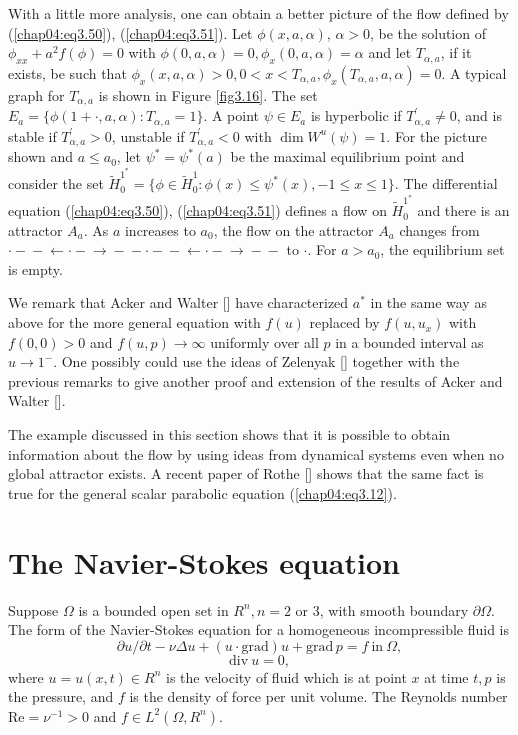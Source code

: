 \documentclass{surv-l}
\theoremstyle{plain}
\theoremstyle{definition}
\numberwithin{equation}{section}
\numberwithin{figure}{chapter}
\begin{document}
With a little more analysis, one can obtain a better picture of the flow defined by (\ref{chap04:eq3.50}), (\ref{chap04:eq3.51}). Let $\phi(x, a, \alpha)$, $\alpha>0$, be the solution of $\phi_{xx}+a^{2}f(\phi)=0$ with $\phi(0,a,\alpha)=0,\phi_{x}(0, a,\alpha)=\alpha$ and let $T_{\alpha,a}$, if it exists, be such that $\phi_{x}(x,a,\alpha)> 0,0<x<T_{\alpha,a},\phi_{x}(T_{\alpha,a},a,\alpha)=0$. A typical graph for $T_{\alpha,a}$ is shown in Figure \ref{fig3.16}. The set $E_{a}=\{\phi(1+\cdot,a,\alpha):T_{\alpha,a}=1\}$. A point $\psi\in E_{a}$ is hyperbolic if $T_{\alpha,a}^{\prime}\neq 0$, and is stable if $T_{\alpha,a}^{\prime}>0$, unstable if $T_{\alpha,a}^{\prime}<0$ with $\dim W^{u}(\psi)=1$. For the picture shown and $a\leq a_{0}$, let $\psi^{\ast}=\psi^{\ast}(a)$ be the maximal equilibrium point and consider the set $\tilde{H}_{0}^{1^{\ast}} =\{\phi\in\tilde{H}_{0}^{1}\!:\phi(x)\leq\psi^{\ast}(x), -1\leq x\leq 1\}$. The differential equation (\ref{chap04:eq3.50}), (\ref{chap04:eq3.51}) defines a flow on $\tilde{H}_{0}^{1^{\ast}}$ and there is an attractor $A_{a}$. As $a$ increases to $a_{0}$, the flow on the attractor $A_{a}$ changes from $\cdot-\!\!\!-\!\!\!\leftarrow\cdot-\!\!\!\rightarrow\!\!\!-\!\!\!-\cdot-\!\!\!-\!\!\!\leftarrow\cdot-\!\!\!\rightarrow\!\!\!-\!\!\!-$ to $\cdot$. For $a>a_{0}$, the equilibrium set is empty.

We remark that Acker and Walter [\citeyear{1978aw}] have characterized $a^{\ast}$ in the same way as above for the more general equation with $f(u)$ replaced by $f(u,u_{x})$ with $f(0,0)>0$ and $ f(u,p)\rightarrow\infty$ uniformly over all $p$ in a bounded interval as $u\rightarrow 1^{-}$. One possibly could use the ideas of Zelenyak [\citeyear{1968z}] together with the previous remarks to give another proof and extension of the results of Acker and Walter [\citeyear{1978aw}].

The example discussed in this section shows that it is possible to obtain information about the flow by using ideas from dynamical systems even when no global attractor exists. A recent paper of Rothe [\citeyear{1987r}] shows that the same fact is true for the general scalar parabolic equation (\ref{chap04:eq3.12}).

\section{The Navier-Stokes equation}\label{sec4.4}

Suppose $\Omega$ is a bounded open set in $R^{n},n=2$ or 3, with smooth boundary $\partial\Omega$. The form of the Navier-Stokes equation for a homogeneous incompressible fluid is
\begin{equation}\label{chap04:eq4.1}
\partial u/\partial t-\nu\Delta u+(u\cdot\mathrm{grad})u+\mathrm{grad}\,p=f\ \mathrm{in}\ \Omega,
\end{equation}
\begin{equation}\label{chap04:eq4.2}
\mathrm{div}\ u=0,
\end{equation}
where $u=u(x,t)\in R^{n}$ is the velocity of fluid which is at point $x$ at time $t,p$ is the pressure, and $f$ is the density of force per unit volume. The Reynolds number $\mathrm{Re}=\nu^{-1}>0$ and $f\in L^{2}(\Omega,R^{n})$.
\end{document}

